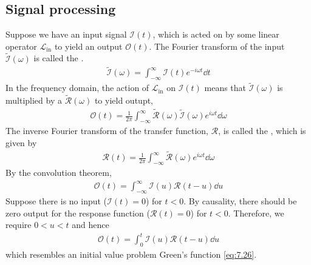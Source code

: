 \subsection{Signal processing}
Suppose we have an input signal $\mathcal I(t)$, which is acted on by some linear operator $\mathcal L_{\text{in}}$ to yield an output $\mathcal O(t)$.
The Fourier transform of the input $\widetilde{\mathcal I}(\omega)$ is called the .
\begin{align} \label{eq:8.27}
	\widetilde{\mathcal I}(\omega) = \int_{-\infty}^\infty \mathcal I(t) e^{-i\omega t} \dd{t}
\end{align}
In the frequency domain, the action of $\mathcal L_{\text{in}}$ on $\mathcal I(t)$ means that $\widetilde{\mathcal I}(\omega)$ is multiplied by a  $\widetilde{\mathcal R}(\omega)$ to yield outupt,
\begin{align} \label{eq:8.28}
	\mathcal O(t) = \frac{1}{2\pi} \int_{-\infty}^\infty \widetilde{\mathcal R}(\omega) \widetilde{\mathcal I}(\omega) e^{i\omega t} \dd{\omega}
\end{align}
The inverse Fourier transform of the transfer function, $\mathcal R$, is called the , which is given by
\begin{align} \label{eq:8.29}
	\mathcal R(t) = \frac{1}{2\pi} \int_{-\infty}^\infty \widetilde{\mathcal R}(\omega) e^{i \omega t}\dd{\omega}
\end{align}
By the convolution theorem,
\begin{align*}
	\mathcal O(t) = \int_{-\infty}^\infty \mathcal I(u) \mathcal R(t-u) \dd{u}
\end{align*}
Suppose there is no input ($\mathcal I(t) = 0$) for $t < 0$.
By causality, there should be zero output for the response function ($\mathcal R(t) = 0$) for $t < 0$.
Therefore, we require $0 < u < t$ and hence
\begin{align} \label{eq:8.30}
	\mathcal O(t) = \int_0^t \mathcal I(u) \mathcal R(t-u) \dd{u}
\end{align}
which resembles an initial value problem Green's function \cref{eq:7.26}.

